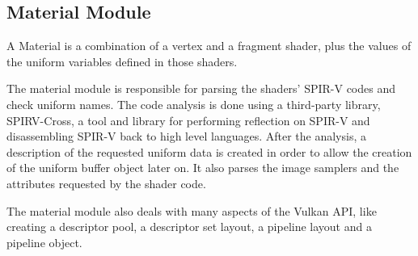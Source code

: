 \subsection{Material Module}
A Material is a combination of a vertex and a fragment shader, plus the values
of the uniform variables defined in those shaders.

The material module is responsible for parsing the shaders' SPIR-V codes and
check uniform names. The code analysis is done using a third-party library,
SPIRV-Cross, a tool and library for performing reflection on SPIR-V and
disassembling SPIR-V back to high level languages. After the analysis, a
description of the requested uniform data is created in order to allow the
creation of the uniform buffer object later on. It also parses the image
samplers and the attributes requested by the shader code.

The material module also deals with many aspects of the Vulkan API, like
creating a descriptor pool, a descriptor set layout, a pipeline layout and
a pipeline object.
